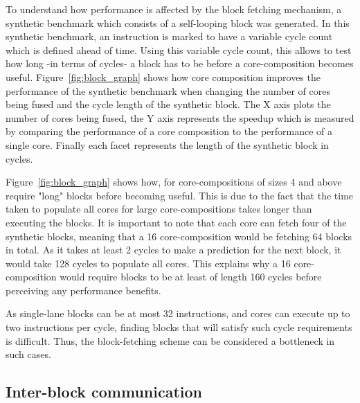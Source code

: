To understand how performance is affected by the block fetching mechanism, a synthetic benchmark which consists of a self-looping block was generated.
In this synthetic benchmark, an instruction is marked to have a variable cycle count which is defined ahead of time.
Using this variable cycle count, this allows to test how long -in terms of cycles- a block has to be before a core-composition becomes useful.
Figure~\ref{fig:block_graph} shows how core composition improves the performance of the synthetic benchmark when changing the number of cores being fused and the cycle length of the synthetic block.
The X axis plots the number of cores being fused, the Y axis represents the speedup which is measured by comparing the performance of a core composition to the performance of a single core.
Finally each facet represents the length of the synthetic block in cycles.

Figure~\ref{fig:block_graph} shows how, for core-compositions of sizes 4 and above require "long" blocks before becoming useful.
This is due to the fact that the time taken to populate all cores for large core-compositions takes longer than executing the blocks.
It is important to note that each core can fetch four of the synthetic blocks, meaning that a 16 core-composition would be fetching 64 blocks in total.
As it takes at least 2 cycles to make a prediction for the next block, it would take 128 cycles to populate all cores.
This explains why a 16 core-composition would require blocks to be at least of length 160 cycles before perceiving any performance benefits.

As single-lane blocks can be at most 32 instructions, and cores can execute up to two instructions per cycle, finding blocks that will satisfy such cycle requirements is difficult.
Thus, the block-fetching scheme can be considered a bottleneck in such cases.

\subsection{Inter-block communication}

